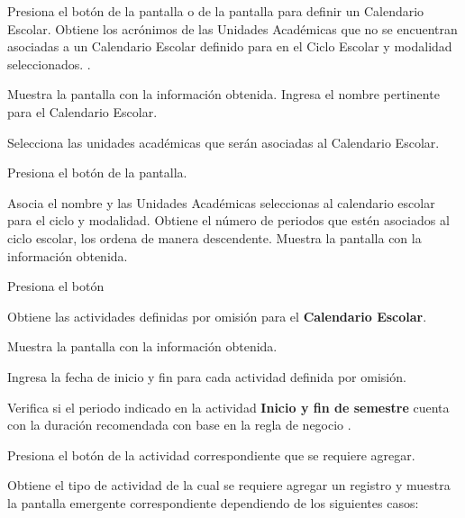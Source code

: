 \begin{UCtrayectoria}
    \UCpaso [\UCactor] Presiona el botón  de la pantalla  o de la pantalla  para definir un Calendario Escolar.
    \UCpaso Obtiene los acrónimos de las Unidades Académicas que no se encuentran asociadas a un Calendario Escolar definido para en el Ciclo Escolar y modalidad seleccionados. .
    
     \UCpaso Muestra la pantalla  con la información obtenida.
    \UCpaso [\UCactor] Ingresa el nombre pertinente para el Calendario Escolar. 
    
    \UCpaso [\UCactor]  Selecciona las unidades académicas que serán asociadas al Calendario Escolar.   
    
    \UCpaso [\UCactor] Presiona el botón  de la pantalla. 
    
    \UCpaso Asocia el nombre y las Unidades Académicas seleccionas al calendario escolar para el ciclo y modalidad. 
    \UCpaso Obtiene el número de periodos que estén asociados al ciclo escolar, los ordena de manera descendente. 
    \UCpaso \label{IN-DAE-CU2.1:continuar} Muestra la pantalla  con la información obtenida. 
    
    \UCpaso [\UCactor] Presiona el botón  
    
    \UCpaso \label{IN-DAE-CU2.1:peri} Obtiene las actividades definidas por omisión para el \textbf{Calendario Escolar}.
    
    \UCpaso Muestra la pantalla  con la información obtenida.
    
    \UCpaso [\UCactor] \label{IN-DAE-CU2.1:sel} Ingresa la fecha de inicio y fin para cada actividad definida por omisión. 
    
    \UCpaso Verifica si el periodo indicado en la actividad \textbf{Inicio y fin de semestre} cuenta con la duración recomendada con base en la regla de negocio . 
    
     \UCpaso [\UCactor] \label{IN-DAE-CU2.1:actividad} Presiona el botón  de la actividad correspondiente que se requiere agregar.
     
    \UCpaso \label{IN-DAE-CU2.1:reg} Obtiene el tipo de actividad de la cual se requiere agregar un registro y muestra la pantalla emergente correspondiente dependiendo de los siguientes casos:\\
        

\end{UCtrayectoria}
